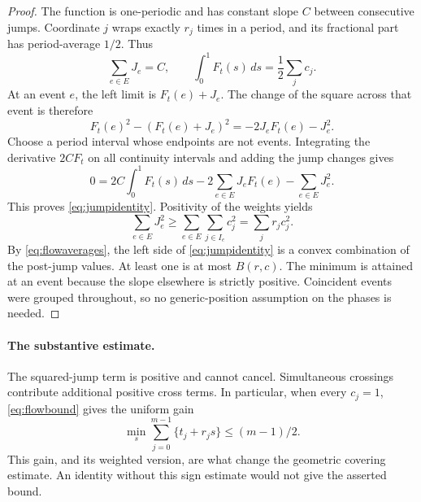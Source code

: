 \documentclass[11pt,a4paper]{article}
\theoremstyle{definition}\newtheorem{definition}[theorem]{Definition}
\theoremstyle{remark}\newtheorem{remark}[theorem]{Remark}
\begin{document}
\begin{proof}
The function is one-periodic and has constant slope $C$ between
consecutive jumps. Coordinate $j$ wraps exactly $r_j$ times in a
period, and its fractional part has period-average $1/2$. Thus
\begin{equation}\label{eq:flowaverages}
 \sum_{e\in E}J_e=C,\qquad
 \int_0^1F_t(s)\,ds=\frac12\sum_jc_j.
\end{equation}
At an event $e$, the left limit is $F_t(e)+J_e$. The change of the
square across that event is therefore
\[
 F_t(e)^2-(F_t(e)+J_e)^2=-2J_eF_t(e)-J_e^2.
\]
Choose a period interval whose endpoints are not events. Integrating
the derivative $2CF_t$ on all continuity intervals and adding the
jump changes gives
\begin{equation}\label{eq:squarebalance}
 0=2C\int_0^1F_t(s)\,ds
       -2\sum_{e\in E}J_eF_t(e)-\sum_{e\in E}J_e^2.
\end{equation}
This proves \eqref{eq:jumpidentity}. Positivity of the weights yields
\begin{equation}\label{eq:noncancellation}
 \sum_{e\in E}J_e^2
 \ge\sum_{e\in E}\sum_{j\in I_e}c_j^2
 =\sum_jr_jc_j^2.
\end{equation}
By \eqref{eq:flowaverages}, the left side of
\eqref{eq:jumpidentity} is a convex combination of the post-jump
values. At least one is at most $B(r,c)$.
The minimum is attained at an event because the slope elsewhere is
strictly positive. Coincident events were grouped throughout, so no
generic-position assumption on the phases is needed.
\end{proof}

\paragraph{The substantive estimate.}
The squared-jump term is positive and cannot cancel. Simultaneous
crossings contribute additional positive cross terms. In particular,
when every $c_j=1$, \eqref{eq:flowbound} gives the uniform gain
\begin{equation}\label{eq:unweighted}
 \min_s\sum_{j=0}^{m-1}\{t_j+r_js\}\le(m-1)/2.
\end{equation}
This gain, and its weighted version, are what change the geometric
covering estimate. An identity without this sign estimate would not
give the asserted bound.
\end{document}
